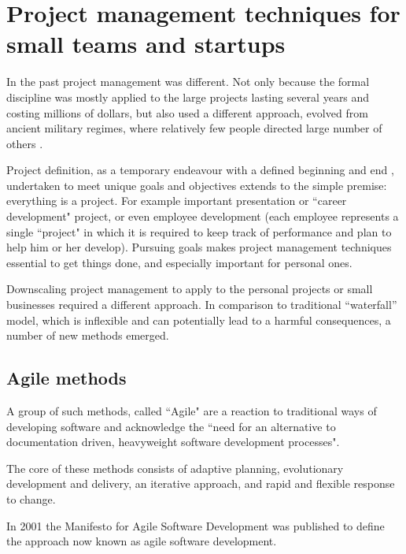 \chapter{Project management techniques for small teams and startups}
\label{chap:techniques}

In the past project management was different. Not only because the formal discipline was mostly applied to the large projects lasting several years and costing millions of dollars, but also used a different approach, evolved from ancient military regimes, where relatively few people directed large number of others \cite{brandon}.

Project definition, as a temporary endeavour with a defined beginning and end \cite{chatfield}, undertaken to meet unique goals and objectives \cite{nokes} extends to the simple premise: everything is a project. For example important presentation or ``career development" project, or even  employee development (each employee represents a single ``project" in which it is required to keep track of performance and plan to help him or her develop). Pursuing goals makes project management techniques essential to get things done, and especially important for personal ones.

Downscaling project management to apply to the personal projects or small businesses required a different approach. In comparison to traditional ``waterfall'' model, which is inflexible and can potentially lead to a harmful consequences, a number of new methods emerged.

\section{Agile methods}

A group of such methods, called ``Agile" are a reaction to traditional ways of developing software and acknowledge the ``need for an alternative to documentation driven, heavyweight software development processes".

The core of these methods consists of adaptive planning, evolutionary development and delivery, an iterative approach, and rapid and flexible response to change.

In 2001 the Manifesto for Agile Software Development \cite{agile-manifesto} was published to define the approach now known as agile software development. 

